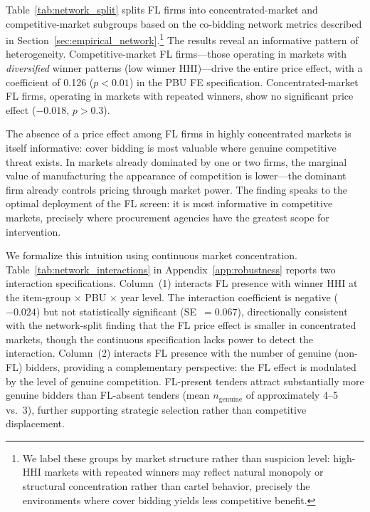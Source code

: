 Table~\ref{tab:network_split} splits FL firms into %
concentrated-market and competitive-market subgroups based on the
co-bidding network metrics described in
Section~\ref{sec:empirical_network}.\footnote{We label these groups by
market structure rather than suspicion level: high-HHI markets with
repeated winners may reflect natural monopoly or structural concentration
rather than cartel behavior, precisely the environments where cover
bidding yields less competitive benefit.}
The results reveal an informative pattern of heterogeneity.
Competitive-market FL firms---those operating in markets with
\emph{diversified} winner patterns (low winner HHI)---drive the entire
price effect, with a coefficient of 0.126 ($p < 0.01$) in the PBU FE
specification. Concentrated-market FL firms, operating in markets with
repeated winners, show no significant price effect ($-0.018$, $p > 0.3$).

The absence of a price effect among FL firms in highly concentrated
markets is itself informative: cover bidding is most valuable where
genuine competitive threat exists. In markets already dominated by one or
two firms, the marginal value of manufacturing the appearance of
competition is lower---the dominant firm already controls pricing through
market power. The finding speaks to the optimal deployment of the FL
screen: it is most informative in competitive markets, precisely where
procurement agencies have the greatest scope for intervention.

We formalize this intuition using continuous market concentration.
Table~\ref{tab:network_interactions} in Appendix~\ref{app:robustness}
reports two interaction specifications. Column~(1) interacts FL presence
with winner HHI at the item-group $\times$ PBU $\times$ year level. The
interaction coefficient is negative ($-0.024$) but not statistically
significant (SE~$= 0.067$), directionally consistent with the
network-split finding that the FL price effect is smaller in concentrated
markets, though the continuous specification lacks power to detect the
interaction. Column~(2)
interacts FL presence with the number of genuine (non-FL) bidders,
providing a complementary perspective: the FL effect is modulated by the
level of genuine competition. FL-present tenders attract substantially
more genuine bidders than FL-absent tenders (mean $n_{\text{genuine}}$
of approximately 4--5 vs.\ 3), further supporting strategic selection
rather than competitive displacement.

